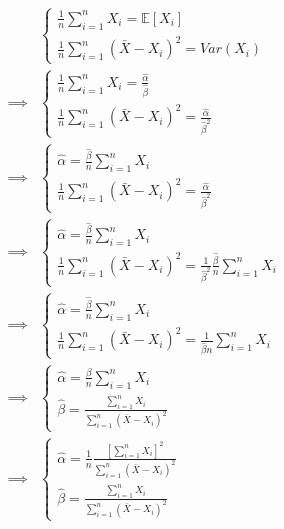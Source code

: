 \documentclass{article}
\newcommand{\E}{\mathbb{E}}
\begin{document}
\begin{align*}
             &
    \begin{cases}
        \frac{1}{n}\sum_{i=1}^n X_i = \E [X_i] \\
        \frac{1}{n}\sum_{i=1}^n (\bar X - X_i)^2 = Var (X_i)
    \end{cases} \\
    \implies &
    \begin{cases}
        \frac{1}{n}\sum_{i=1}^n X_i = \frac{\hat\alpha}{\hat\beta} \\
        \frac{1}{n}\sum_{i=1}^n (\bar X - X_i)^2 = \frac{\hat\alpha}{\hat\beta^2}
    \end{cases} \\
    \implies &
    \begin{cases}
        \hat\alpha = \frac{\hat\beta}{n}\sum_{i=1}^n X_i \\
        \frac{1}{n}\sum_{i=1}^n (\bar X - X_i)^2 = \frac{\hat\alpha}{\hat\beta^2}
    \end{cases} \\
    \implies &
    \begin{cases}
        \hat\alpha = \frac{\hat\beta}{n}\sum_{i=1}^n X_i \\
        \frac{1}{n}\sum_{i=1}^n (\bar X - X_i)^2 = \frac{1}{\hat\beta^2} \frac{\hat\beta}{n}\sum_{i=1}^n X_i
    \end{cases} \\
    \implies &
    \begin{cases}
        \hat\alpha = \frac{\hat\beta}{n}\sum_{i=1}^n X_i \\
        \frac{1}{n}\sum_{i=1}^n (\bar X - X_i)^2 = \frac{1}{\hat\beta n}\sum_{i=1}^n X_i
    \end{cases} \\
    \implies &
    \begin{cases}
        \hat\alpha = \frac{\beta}{n}\sum_{i=1}^n X_i \\
        \hat\beta = \frac{\sum_{i=1}^n X_i}{\sum_{i=1}^n (\bar X - X_i)^2}
    \end{cases} \\
    \implies &
    \begin{cases}
        \hat\alpha = \frac{1}{n}\frac{\left[\sum_{i=1}^n X_i\right]^2}{\sum_{i=1}^n (\bar X - X_i)^2} \\
        \hat\beta = \frac{\sum_{i=1}^n X_i}{\sum_{i=1}^n (\bar X - X_i)^2}
    \end{cases} \\
\end{align*}
\end{document}
